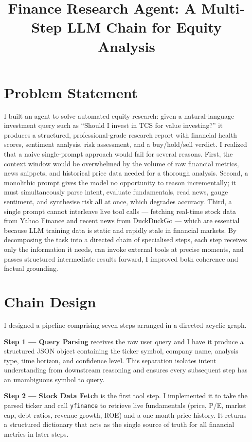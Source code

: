 \documentclass[11pt,a4paper]{article}
\title{Finance Research Agent: A Multi-Step LLM Chain for Equity Analysis}
\author{}
\date{}
\begin{document}
\maketitle

\section{Problem Statement}

I built an agent to solve automated equity research: given a natural-language investment query such as ``Should I invest in TCS for value investing?'' it produces a structured, professional-grade research report with financial health scores, sentiment analysis, risk assessment, and a buy/hold/sell verdict. I realized that a naive single-prompt approach would fail for several reasons. First, the context window would be overwhelmed by the volume of raw financial metrics, news snippets, and historical price data needed for a thorough analysis. Second, a monolithic prompt gives the model no opportunity to reason incrementally; it must simultaneously parse intent, evaluate fundamentals, read news, gauge sentiment, and synthesise risk all at once, which degrades accuracy. Third, a single prompt cannot interleave live tool calls --- fetching real-time stock data from Yahoo Finance and recent news from DuckDuckGo --- which are essential because LLM training data is static and rapidly stale in financial markets. By decomposing the task into a directed chain of specialised steps, each step receives only the information it needs, can invoke external tools at precise moments, and passes structured intermediate results forward, I improved both coherence and factual grounding.

\section{Chain Design}

I designed a pipeline comprising seven steps arranged in a directed acyclic graph.

\textbf{Step 1 --- Query Parsing} receives the raw user query and I have it produce a structured JSON object containing the ticker symbol, company name, analysis type, time horizon, and confidence level. This separation isolates intent understanding from downstream reasoning and ensures every subsequent step has an unambiguous symbol to query.

\textbf{Step 2 --- Stock Data Fetch} is the first tool step. I implemented it to take the parsed ticker and call \texttt{yfinance} to retrieve live fundamentals (price, P/E, market cap, debt ratios, revenue growth, ROE) and a one-month price history. It returns a structured dictionary that acts as the single source of truth for all financial metrics in later steps.
\end{document}
